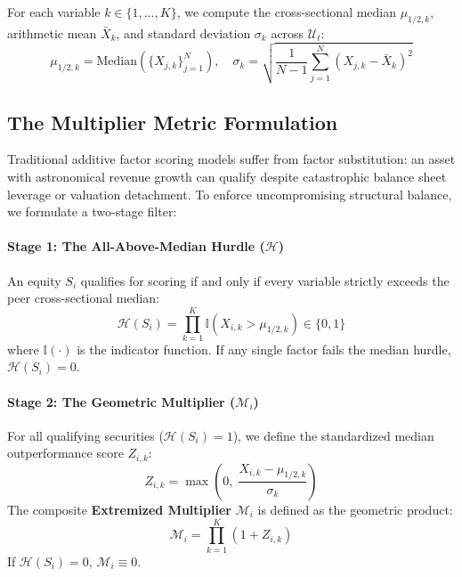 \documentclass[11pt]{article}
\begin{document}
For each variable $k \in \{1, \dots, K\}$, we compute the cross-sectional median $\mu_{1/2, k}$, arithmetic mean $\bar{X}_k$, and standard deviation $\sigma_k$ across $\mathcal{U}_t$:
\begin{equation}
    \mu_{1/2, k} = \text{Median}(\{X_{j, k}\}_{j=1}^N), \quad \sigma_k = \sqrt{\frac{1}{N-1} \sum_{j=1}^N (X_{j, k} - \bar{X}_k)^2}
\end{equation}

\subsection{The Multiplier Metric Formulation}

Traditional additive factor scoring models suffer from factor substitution: an asset with astronomical revenue growth can qualify despite catastrophic balance sheet leverage or valuation detachment. To enforce uncompromising structural balance, we formulate a two-stage filter:

\paragraph{Stage 1: The All-Above-Median Hurdle ($\mathcal{H}$)}
An equity $S_i$ qualifies for scoring if and only if every variable strictly exceeds the peer cross-sectional median:
\begin{equation}
    \mathcal{H}(S_i) = \prod_{k=1}^K \mathbb{I}\left(X_{i, k} > \mu_{1/2, k}\right) \in \{0, 1\}
\end{equation}
where $\mathbb{I}(\cdot)$ is the indicator function. If any single factor fails the median hurdle, $\mathcal{H}(S_i) = 0$.

\paragraph{Stage 2: The Geometric Multiplier ($\mathcal{M}_i$)}
For all qualifying securities ($\mathcal{H}(S_i) = 1$), we define the standardized median outperformance score $Z_{i, k}$:
\begin{equation}
    Z_{i, k} = \max\left(0, \; \frac{X_{i, k} - \mu_{1/2, k}}{\sigma_k}\right)
\end{equation}
The composite \textbf{Extremized Multiplier} $\mathcal{M}_i$ is defined as the geometric product:
\begin{equation}
    \mathcal{M}_i = \prod_{k=1}^K \left(1 + Z_{i, k}\right)
\end{equation}
If $\mathcal{H}(S_i) = 0$, $\mathcal{M}_i \equiv 0$.
\end{document}

